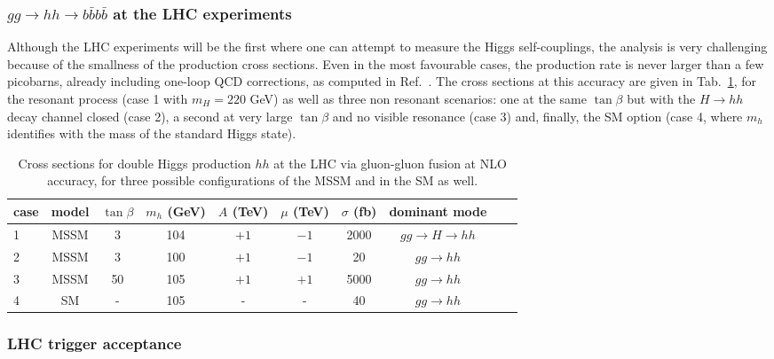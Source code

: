 
\subsubsection{$gg\to hh\to b\bar{b}b\bar{b}$ at the LHC experiments}
\label{subsubsec_hadron_LHC}

Although the LHC experiments will be the first where one can attempt
to measure the Higgs self-couplings, the analysis is very challenging
because of the smallness of the production cross sections.  Even in
the most favourable cases, the production rate is never larger than a
few picobarns, already including one-loop QCD corrections, as computed
in Ref.~\cite{spira}. The cross sections at this accuracy are given in
Tab.~\ref{tab:cross}, for the resonant process (case 1 with $m_H = 220$ GeV) 
as well as
three non resonant scenarios: one at the same $\tan\beta$ but with
the $H\to hh$ decay channel closed (case 2), a second at very large
$\tan\beta$ and no visible resonance (case 3) and, finally, the SM
option (case 4, where $m_h$ identifies with the mass of the standard
Higgs state).

\begin{table}[!ht] 
\begin{center}
\begin{tabular}{|l||c|c|c|c|c|c|c|c|c|} \hline
case & model & $\tan\beta$ & $m_h$ (GeV) 
& $A$ (TeV) & 
$\mu$ (TeV) & $\sigma$ (fb) & dominant mode \\ \hline
1  & MSSM  & 3       & 104   
& $+1$   & $-1$   & 2000  & $gg \to H \to hh$ \\
2  & MSSM  & 3       & 100   
& $+1$   & $-1$   & 20  & $gg \to hh$ \\
3  & MSSM  & 50      & 105   
& $+1$   & $+1$   & 5000 & $gg \to hh$ \\
4  & SM    & -       & 105   
& -   & -   & 40 & $gg \to hh$ \\ \hline
\end{tabular}
\caption{Cross sections for double Higgs production $hh$ 
at the LHC via 
gluon-gluon fusion at NLO accuracy, for three possible configurations
of the MSSM and in the SM as well.
}
\label{tab:cross}
\vspace*{-7mm}
\end{center}
\end{table} 

\subsubsection{LHC trigger acceptance}
\label{subsubsect_trigger}

